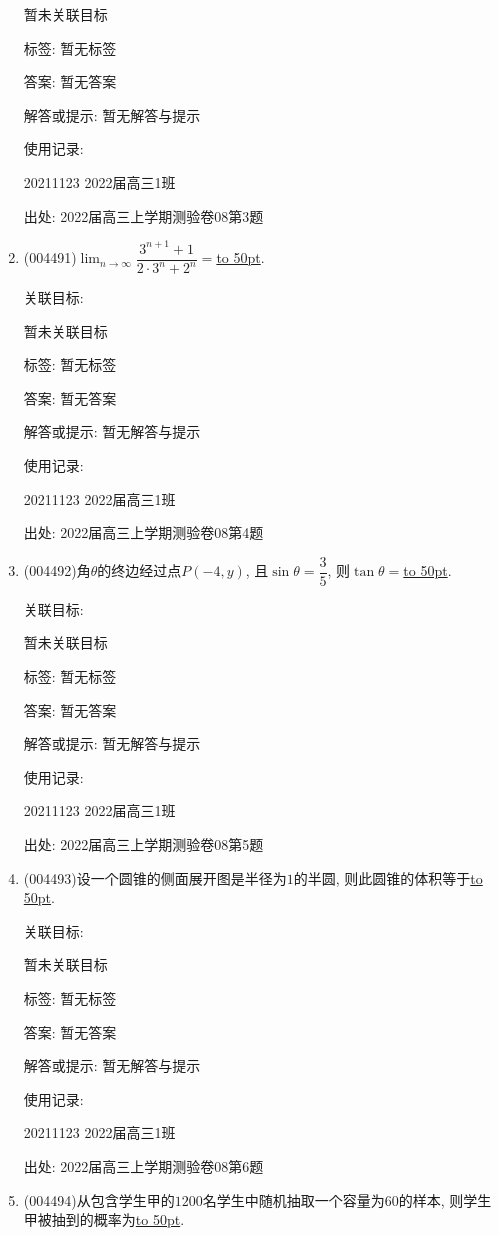 \documentclass[10pt,a4paper]{article}
\newcommand{\blank}[1]{\underline{\hbox to #1pt{}}}
\begin{document}
\begin{enumerate}[1.]
暂未关联目标



标签: 暂无标签

答案: 暂无答案

解答或提示: 暂无解答与提示

使用记录:

20211123	2022届高三1班	


出处: 2022届高三上学期测验卷08第3题
\item { (004491)}$\displaystyle\lim_{n\to \infty}\dfrac{3^{n+1}+1}{2\cdot 3^n+2^n}=$\blank{50}.


关联目标:

暂未关联目标



标签: 暂无标签

答案: 暂无答案

解答或提示: 暂无解答与提示

使用记录:

20211123	2022届高三1班	


出处: 2022届高三上学期测验卷08第4题
\item { (004492)}角$\theta$的终边经过点$P(-4,y)$, 且$\sin\theta =\dfrac 35$, 则$\tan\theta=$\blank{50}.


关联目标:

暂未关联目标



标签: 暂无标签

答案: 暂无答案

解答或提示: 暂无解答与提示

使用记录:

20211123	2022届高三1班	


出处: 2022届高三上学期测验卷08第5题
\item { (004493)}设一个圆锥的侧面展开图是半径为$1$的半圆, 则此圆锥的体积等于\blank{50}.


关联目标:

暂未关联目标



标签: 暂无标签

答案: 暂无答案

解答或提示: 暂无解答与提示

使用记录:

20211123	2022届高三1班	


出处: 2022届高三上学期测验卷08第6题
\item { (004494)}从包含学生甲的$1200$名学生中随机抽取一个容量为$60$的样本, 则学生甲被抽到的概率为\blank{50}.



\end{enumerate}
\end{document}
